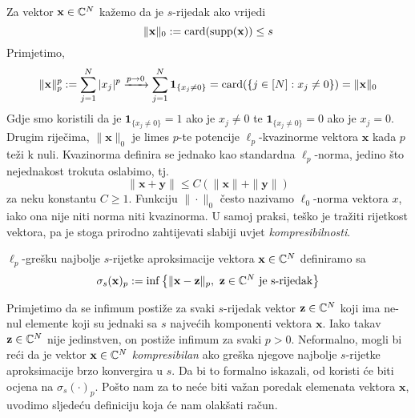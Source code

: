 \documentclass[a4paper,twoside,12pt]{memoir} %
\newcommand{\vect}[1]{\mathbf{#1}}
\renewcommand{\vec}{\vect}
\newcommand{\card}{\text{\normalfont{card}}}
\newcommand{\supp}{\text{\normalfont{supp}}}
\begin{document}
\noindent Za vektor $\vec{x}\in\C^{N}$ ka\v{z}emo da je $s$-rijedak ako vrijedi $$\|\vec{x}\|_0 := \card(\supp(\vec{x})) \leq s$$
Primjetimo,
$$\|\vec{x}\|_p^p := \sum_{j=1}^N|x_j|^p \xrightarrow{p\rightarrow 0} \sum_{j=1}^N\mathbf{1}_{\{x_j \neq 0\}} = \card(\{j \in [N]:x_j \neq 0\}) = \|\vec{x}\|_0$$
Gdje smo koristili da je $\mathbf{1}_{\{x_j \neq 0\}} = 1$  ako je $x_j \neq 0$ te $\mathbf{1}_{\{x_j \neq 0\}} = 0$  ako je $x_j = 0$. Drugim rije\v{c}ima, $\|\vec{x}\|_0$ je limes $p$-te potencije $\ell_p$-kvazinorme vektora $\vec{x}$ kada $p$ te\v{z}i k nuli. Kvazinorma definira se jednako kao standardna $\ell_p$-norma, jedino \v{s}to nejednakost trokuta oslabimo, tj. 
$$\|\vec{x}+\vec{y}\|\leq C(\|\vec{x}\|+\|\vec{y}\|)$$ 
za neku konstantu $C \geq 1$.
Funkciju $\|\cdot\|_0$ \v{c}esto nazivamo $\ell_0$-norma vektora $x$, iako  ona nije niti norma niti kvazinorma. U samoj praksi, te\v{s}ko je tra\v{z}iti rijetkost vektora, pa je stoga prirodno zahtijevati slabiji uvjet \textit{kompresibilnosti}.  
\begin{defn}\label{greska_naj_s_aprox}
    $\ell_p$-gre\v{s}ku najbolje $s$-rijetke aproksimacije vektora $\vec{x}\in\C^{N}$ definiramo sa 
    $$\sigma_s(\vec{x})_p := \inf\big\{\|\vec{x}-\vec{z}\|_p,\ \vec{z} \in \C^{N} \ \text{je s-rijedak}\big\}$$
\end{defn}
\indent Primjetimo da se infimum posti\v{z}e za svaki $s$-rijedak vektor $\vec{z} \in \C^{N}$ koji ima ne-nul elemente koji su jednaki sa $s$ najve\'cih komponenti vektora $\vec{x}$. Iako takav $\vec{z} \in \C^{N}$ nije jedinstven, on posti\v{z}e infimum za svaki $p > 0$. Neformalno, mogli bi re\'ci da je vektor $\vec{x} \in \C^{N}$ \textit{kompresibilan} ako gre\v{s}ka njegove najbolje $s$-rijetke aproksimacije brzo konvergira u $s$. Da bi to formalno iskazali, od koristi \'ce biti ocjena na $\sigma_s(\cdot)_p$. Po\v{s}to nam za to ne\'ce biti va\v{z}an poredak elemenata vektora $\vec{x}$, uvodimo sljede\'cu definiciju koja \'ce nam olak\v{s}ati ra\v{c}un.
\end{document}
